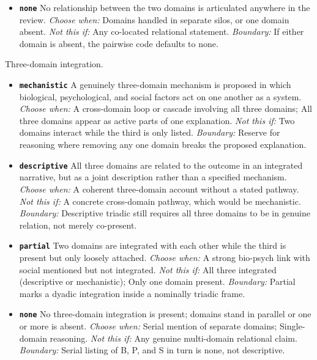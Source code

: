 \documentclass[11pt]{article}
\begin{document}
\begin{description}
\begin{itemize}[leftmargin=1.3em,itemsep=2pt,topsep=2pt]
  \item \textbf{\texttt{none}} No relationship between the two domains is articulated anywhere in the review. {\small \textit{Choose when:} Domains handled in separate silos, or one domain absent. \textit{Not this if:} Any co-located relational statement. \textit{Boundary:} If either domain is absent, the pairwise code defaults to none.}
  \end{itemize}
\item[\texttt{integration\_triadic}] Three-domain integration.
  \begin{itemize}[leftmargin=1.3em,itemsep=2pt,topsep=2pt]
  \item \textbf{\texttt{mechanistic}} A genuinely three-domain mechanism is proposed in which biological, psychological, and social factors act on one another as a system. {\small \textit{Choose when:} A cross-domain loop or cascade involving all three domains; All three domains appear as active parts of one explanation. \textit{Not this if:} Two domains interact while the third is only listed. \textit{Boundary:} Reserve for reasoning where removing any one domain breaks the proposed explanation.}
  \item \textbf{\texttt{descriptive}} All three domains are related to the outcome in an integrated narrative, but as a joint description rather than a specified mechanism. {\small \textit{Choose when:} A coherent three-domain account without a stated pathway. \textit{Not this if:} A concrete cross-domain pathway, which would be mechanistic. \textit{Boundary:} Descriptive triadic still requires all three domains to be in genuine relation, not merely co-present.}
  \item \textbf{\texttt{partial}} Two domains are integrated with each other while the third is present but only loosely attached. {\small \textit{Choose when:} A strong bio-psych link with social mentioned but not integrated. \textit{Not this if:} All three integrated (descriptive or mechanistic); Only one domain present. \textit{Boundary:} Partial marks a dyadic integration inside a nominally triadic frame.}
  \item \textbf{\texttt{none}} No three-domain integration is present; domains stand in parallel or one or more is absent. {\small \textit{Choose when:} Serial mention of separate domains; Single-domain reasoning. \textit{Not this if:} Any genuine multi-domain relational claim. \textit{Boundary:} Serial listing of B, P, and S in turn is none, not descriptive.}
  \end{itemize}

\end{description}
\end{document}
